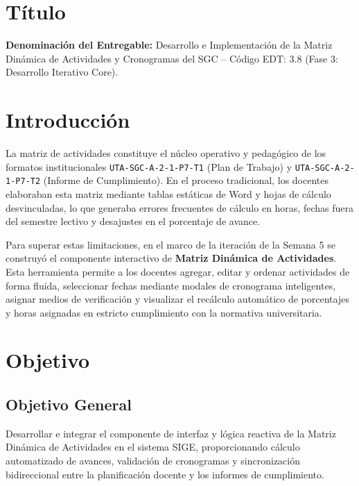 \documentclass[12pt,a4paper]{article}
\begin{document}

\vspace{0.25cm}
\section{Título}
\textbf{Denominación del Entregable:} Desarrollo e Implementación de la Matriz Dinámica de Actividades y Cronogramas del SGC -- Código EDT: 3.8 (Fase 3: Desarrollo Iterativo Core).

\section{Introducción}
La matriz de actividades constituye el núcleo operativo y pedagógico de los formatos institucionales \texttt{UTA-SGC-A-2-1-P7-T1} (Plan de Trabajo) y \texttt{UTA-SGC-A-2-1-P7-T2} (Informe de Cumplimiento). En el proceso tradicional, los docentes elaboraban esta matriz mediante tablas estáticas de Word y hojas de cálculo desvinculadas, lo que generaba errores frecuentes de cálculo en horas, fechas fuera del semestre lectivo y desajustes en el porcentaje de avance.

Para superar estas limitaciones, en el marco de la iteración de la Semana 5 se construyó el componente interactivo de \textbf{Matriz Dinámica de Actividades}. Esta herramienta permite a los docentes agregar, editar y ordenar actividades de forma fluida, seleccionar fechas mediante modales de cronograma inteligentes, asignar medios de verificación y visualizar el recálculo automático de porcentajes y horas asignadas en estricto cumplimiento con la normativa universitaria.

\section{Objetivo}

\subsection{Objetivo General}
Desarrollar e integrar el componente de interfaz y lógica reactiva de la Matriz Dinámica de Actividades en el sistema SIGE, proporcionando cálculo automatizado de avances, validación de cronogramas y sincronización bidireccional entre la planificación docente y los informes de cumplimiento.
\end{document}
